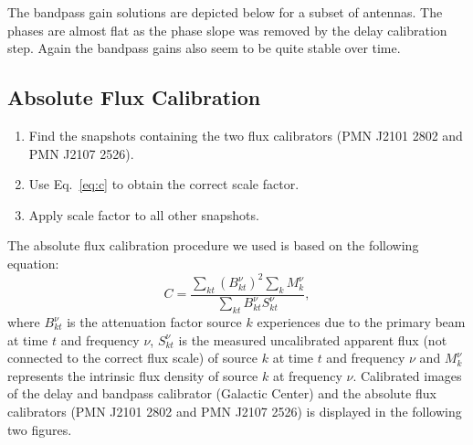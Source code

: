 \documentclass[a0,portrait]{a0poster}
\begin{document}
\begin{multicols}{2}

The bandpass gain solutions are depicted below for a subset of antennas.
The phases are almost flat as the phase slope was removed by the delay calibration step. Again the bandpass 
gains also seem to be quite stable over time.


\subsection*{Absolute Flux Calibration}
\begin{enumerate}
 \item Find the snapshots containing the two flux calibrators (PMN J2101 2802 and PMN J2107 2526).
 \item Use Eq.~\eqref{eq:c} to obtain the correct scale factor.
 \item Apply scale factor to all other snapshots.
\end{enumerate}
The absolute flux calibration procedure we used is based on the following equation:
\begin{equation}
C = \frac{\sum_{kt}(B_{kt}^{\nu})^2\sum_k{M_{k}^{\nu}}}{\sum_{kt}B_{kt}^{\nu}S_{kt}^{\nu}},\label{eq:c}
\end{equation}
where $B_{kt}^{\nu}$ is the attenuation factor source $k$ experiences due to the primary beam at time $t$ and frequency $\nu$,
$S_{kt}^{\nu}$ is the measured uncalibrated apparent flux (not connected to the correct flux scale) of source $k$ at time $t$ and frequency $\nu$ and $M_{k}^{\nu}$ represents the 
intrinsic flux density of source $k$ at frequency $\nu$. 
Calibrated images of the delay and bandpass calibrator (Galactic Center) and the absolute flux calibrators (PMN J2101 2802 and PMN J2107 2526) is displayed in
the following two figures. 


\end{multicols}
\end{document}
